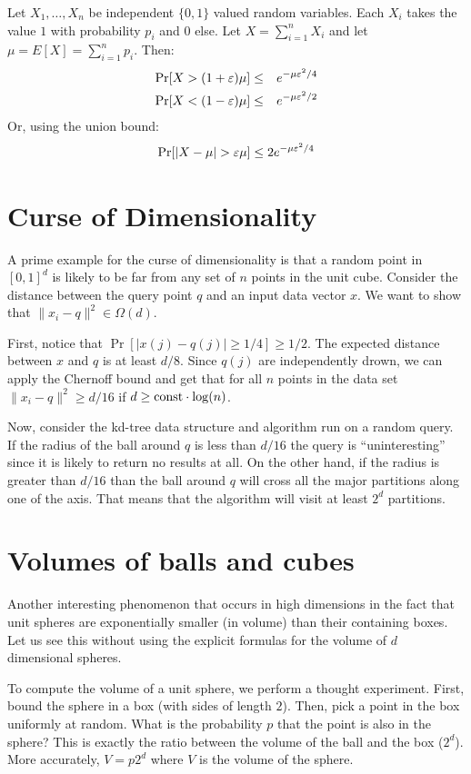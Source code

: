 \documentclass{article}
\begin{document}
\begin{theorem}
Let $X_1,\ldots,X_n$ be independent
$\{0,1\}$ valued random variables. Each $X_i$ takes the value $1$
with probability $p_i$ and $0$ else. Let $X = \sum_{i=1}^{n}X_i$ and
let $\mu = E[X] = \sum_{i=1}^{n}p_i$. Then:
\begin{eqnarray*}
\Pr[X > (1+\varepsilon)\mu] &\le& e^{-\mu \varepsilon^2/4}\\
\Pr[X < (1-\varepsilon)\mu] &\le& e^{-\mu \varepsilon^2/2}
\end{eqnarray*}
Or, using the union bound:
\[
\Pr[|X - \mu| > \varepsilon\mu] \le 2e^{-\mu \varepsilon^2/4}
\]
\end{theorem}




\section{Curse of Dimensionality}
A prime example for the curse of dimensionality is that a random point in $[0,1]^d$ is likely to be far from any set of $n$ points in the unit cube.
Consider the distance between the query point $q$ and an input data vector $x$.
We want to show that $\|x_i-q\|^2 \in \Omega(d)$.

First, notice that $\Pr[|x(j)- q(j)| \ge 1/4] \ge 1/2$. The expected distance between $x$ and $q$ is at least $d/8$.
Since $q(j)$ are independently drown, we can apply the Chernoff bound and get that for all $n$ points in the data set
$\|x_i-q\|^2 \ge d/16$ if $d \ge {\operatorname{const}}\cdot\log(n)$.

Now, consider the kd-tree data structure and algorithm run on a random query.
If the radius of the ball around $q$ is less than $d/16$ the query is ``uninteresting'' since it is likely to return no results at all.
On the other hand, if the radius is greater than $d/16$ than the ball around $q$ will cross all the major partitions 
along one of the axis. That means that the algorithm will visit at least $2^d$ partitions.


\section{Volumes of balls and cubes}
Another interesting phenomenon that occurs in high dimensions in the fact that unit spheres 
are exponentially smaller (in volume) than their containing boxes.
Let us see this without using the explicit formulas for the volume of $d$ dimensional spheres.

To compute the volume of a unit sphere, we perform a thought experiment.
First, bound the sphere in a box (with sides of length $2$).
Then, pick a point in the box uniformly at random. What is the probability $p$ that
the point is also in the sphere? This is exactly the ratio between the volume of the ball and the box ($2^d$).
More accurately, $V = p2^d$ where $V$ is the volume of the sphere.
\end{document}
